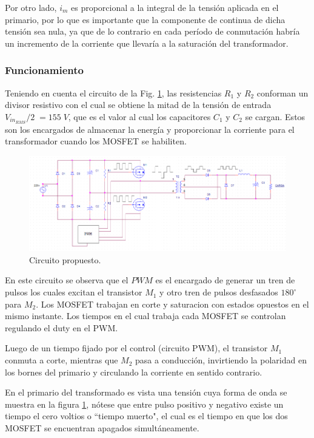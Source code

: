 \documentclass[11pt, a4paper]{article}
\begin{document}
Por otro lado, $i_m$ es proporcional a la integral de la tensión aplicada en el primario, por lo que es importante que la componente de continua de dicha tensión sea nula, ya que de lo contrario en cada período de conmutación habría un incremento de la corriente que llevaría a la saturación del transformador.

\subsubsection{Funcionamiento}
Teniendo en cuenta el circuito de la Fig. \ref{propuesto}, las resistencias $R_1$ y $R_2$ conforman un divisor resistivo con el cual se obtiene la mitad de la tensión de entrada ${V_{in_{RMS}}}/{2} \; = 155 \; V$, que es el valor al cual los capacitores $C_1$ y $C_2$ se cargan. Estos son los encargados de almacenar la energía y proporcionar la corriente para el transformador cuando los MOSFET se habiliten.  

\begin{figure}[h]
	\centering
	\includegraphics[width = \textwidth ]{Imagenes/funcionamiento}
	\caption{Circuito propuesto.}
	\label{propuesto}
\end{figure}

En este circuito se observa que el $PWM$ es el encargado de generar un tren de pulsos los cuales excitan el transistor $M_1$ y otro tren de pulsos desfasados $180^{\circ}$ para $M_2$. Los MOSFET trabajan en corte y saturacion con estados opuestos en el mismo instante. Los tiempos en el cual trabaja cada MOSFET se controlan regulando el duty en el PWM.

Luego de un tiempo fijado por el control (circuito PWM), el transistor $M_1$ conmuta a corte, mientras que $M_2$ pasa a conducción, invirtiendo la polaridad en los bornes del primario y circulando la corriente en sentido contrario.

En el primario del transformado es vista una tensión cuya forma de onda se muestra en la figura \ref{propuesto}, nótese que entre pulso positivo y negativo existe un tiempo el cero voltios o ``tiempo muerto", el cual es el tiempo en que los dos MOSFET se encuentran apagados simultáneamente. 
\end{document}
